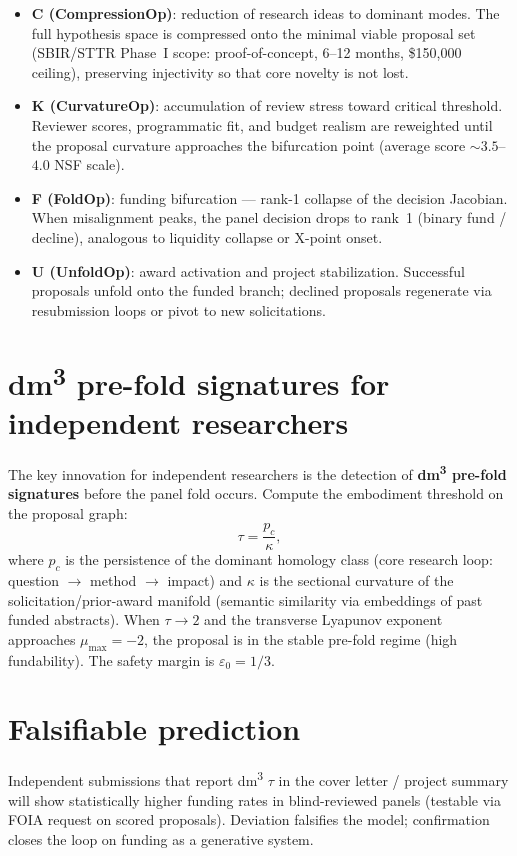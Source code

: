 \begin{itemize}
\item \textbf{C (CompressionOp)}: reduction of research ideas to dominant modes. The full hypothesis space is compressed onto the minimal viable proposal set (SBIR/STTR Phase~I scope: proof-of-concept, 6--12 months, \$150,000 ceiling), preserving injectivity so that core novelty is not lost.
\item \textbf{K (CurvatureOp)}: accumulation of review stress toward critical threshold. Reviewer scores, programmatic fit, and budget realism are reweighted until the proposal curvature approaches the bifurcation point (average score $\sim 3.5$--$4.0$ NSF scale).
\item \textbf{F (FoldOp)}: funding bifurcation --- rank-1 collapse of the decision Jacobian. When misalignment peaks, the panel decision drops to rank~1 (binary fund / decline), analogous to liquidity collapse or X-point onset.
\item \textbf{U (UnfoldOp)}: award activation and project stabilization. Successful proposals unfold onto the funded branch; declined proposals regenerate via resubmission loops or pivot to new solicitations.
\end{itemize}

\section{dm\textsuperscript{3} pre-fold signatures for independent researchers}

The key innovation for independent researchers is the detection of \textbf{dm\textsuperscript{3} pre-fold signatures} before the panel fold occurs. Compute the embodiment threshold on the proposal graph:
\[
\tau = \frac{p_c}{\kappa},
\]
where \(p_c\) is the persistence of the dominant homology class (core research loop: question $\to$ method $\to$ impact) and \(\kappa\) is the sectional curvature of the solicitation/prior-award manifold (semantic similarity via embeddings of past funded abstracts). When \(\tau \to 2\) and the transverse Lyapunov exponent approaches \(\mu_{\max} = -2\), the proposal is in the stable pre-fold regime (high fundability). The safety margin is \(\varepsilon_0 = 1/3\).

\section{Falsifiable prediction}

Independent submissions that report dm\textsuperscript{3} \(\tau\) in the cover letter / project summary will show statistically higher funding rates in blind-reviewed panels (testable via FOIA request on scored proposals). Deviation falsifies the model; confirmation closes the loop on funding as a generative system.

